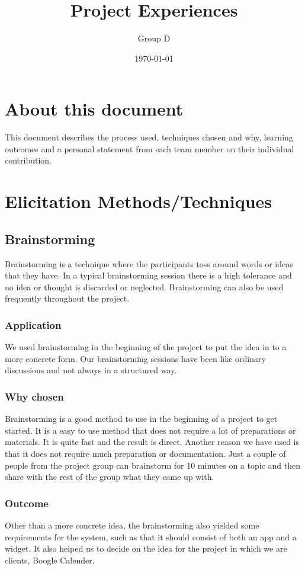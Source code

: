 \documentclass[a4paper]{article}
\title{Project Experiences}
\author{Group D}
\date{\today}
\begin{document}
	\maketitle
	\thispagestyle{empty}
	\setcounter{page}{0}
	\pagebreak
	\tableofcontents
	\pagebreak
	
  \section{About this document}
  This document describes the process used, techniques chosen and why, learning outcomes and a personal statement from each team member on their individual contribution.
  \section{Elicitation Methods/Techniques}
  \subsection{Brainstorming}
Brainstorming is a technique where the participants toss around words or ideas that they have. In a typical brainstorming session there is a high tolerance and no idea or thought is discarded or neglected. Brainstorming can also be used frequently throughout the project.
    \subsubsection{Application}
We used brainstorming in the beginning of the project to put the idea in to a more concrete form. Our brainstorming sessions have been like ordinary discussions and not always in a structured way.
    \subsubsection{Why chosen}
Brainstorming is a good method to use in the beginning of a project to get started. It is a easy to use method that does not require a lot of preparations or materials. It is quite fast and the result is direct. Another reason we have used is that it does not require much preparation or documentation. Just a couple of people from the project group can brainstorm for 10 minutes on a topic and then share with the rest of the group what they came up with.

    \subsubsection{Outcome}
    Other than a more concrete idea, the brainstorming also yielded some requirements for the system, such as that it should consist of both an app and a widget. It also helped us to decide on the idea for the project in which we are clients, Boogle Calender.
\end{document}
